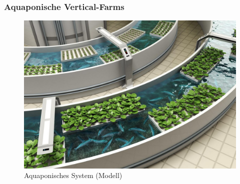 \subsubsection{Aquaponische Vertical-Farms}
\begin{figure}
    \centering
    \includegraphics[width=0.9\linewidth]{1682655900899.jpg}
    \caption{Aquaponisches System (Modell)}
    \label{fig:enter-label}
\end{figure}
